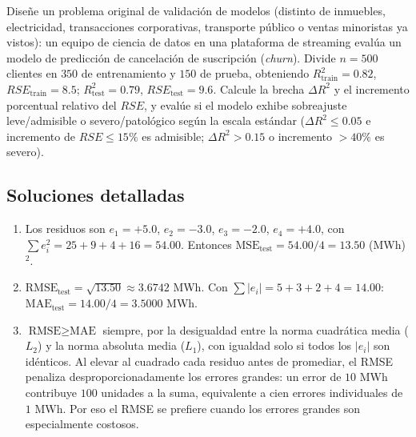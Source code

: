 \begin{problema}
	\label{prob:9689172}
	Diseñe un problema original de validación de modelos (distinto de inmuebles, electricidad, transacciones corporativas, transporte público o ventas minoristas ya vistos): un equipo de ciencia de datos en una plataforma de streaming evalúa un modelo de predicción de cancelación de suscripción (\emph{churn}). Divide $n=500$ clientes en $350$ de entrenamiento y $150$ de prueba, obteniendo $R_{\text{train}}^2=0.82$, $RSE_{\text{train}}=8.5$; $R_{\text{test}}^2=0.79$, $RSE_{\text{test}}=9.6$. Calcule la brecha $\Delta R^2$ y el incremento porcentual relativo del $RSE$, y evalúe si el modelo exhibe sobreajuste leve/admisible o severo/patológico según la escala estándar ($\Delta R^2\le0.05$ e incremento de $RSE\le15\%$ es admisible; $\Delta R^2>0.15$ o incremento $>40\%$ es severo).
\end{problema}

\subsection*{Soluciones detalladas}

\begin{solproblema}[prob:ca86634]
	\begin{enumerate}
		\item Los residuos son $e_1=+5.0$, $e_2=-3.0$, $e_3=-2.0$, $e_4=+4.0$, con $\sum e_i^2=25+9+4+16=54.00$. Entonces $\text{MSE}_{\text{test}}=54.00/4=13.50$ (MWh)$^2$.
		\item $\text{RMSE}_{\text{test}}=\sqrt{13.50}\approx3.6742$ MWh. Con $\sum|e_i|=5+3+2+4=14.00$: $\text{MAE}_{\text{test}}=14.00/4=3.5000$ MWh.
		\item $\text{RMSE}\ge\text{MAE}$ siempre, por la desigualdad entre la norma cuadrática media ($L_2$) y la norma absoluta media ($L_1$), con igualdad solo si todos los $|e_i|$ son idénticos. Al elevar al cuadrado cada residuo antes de promediar, el RMSE penaliza desproporcionadamente los errores grandes: un error de $10$ MWh contribuye $100$ unidades a la suma, equivalente a cien errores individuales de $1$ MWh. Por eso el RMSE se prefiere cuando los errores grandes son especialmente costosos.
	\end{enumerate}
\end{solproblema}

